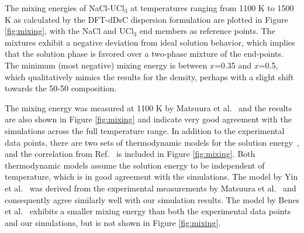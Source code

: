 \documentclass[preprint,3p,10pt,onecolumn,number,sort&compress]{elsarticle}
\begin{document}
{The mixing energies of NaCl-UCl$_3$ at temperatures ranging from 1100 K to 1500 K as calculated by the DFT-dDsC dispersion formulation are plotted in Figure \ref{fig:mixing}, with the NaCl and UCl$_3$ end members as reference points. The mixtures exhibit a negative deviation from ideal solution behavior, which implies that the solution phase is favored over a two-phase mixture of the end-points. 
 The minimum (most negative) mixing energy is between $x$=0.35 and $x$=0.5, which qualitatively mimics the results for the density, perhaps with a slight shift towards the 50-50 composition. %
 
 The mixing energy was measured at 1100 K by Matsuura et al.~\cite{Matsuura} and the results are also shown in Figure \ref{fig:mixing} and indicate very good agreement with the simulations across the full temperature range. In addition to the experimental data points, there are two sets of thermodynamic models for the solution energy~\cite{BENES2008,YIN2020}, and the correlation from Ref.~\cite{YIN2020} is included in Figure \ref{fig:mixing}. Both thermodynamic models assume the solution energy to be independent of temperature, which is in good agreement with the simulations. The model by Yin et al.~\cite{YIN2020} was derived from the experimental measurements by Matsuura et al.~\cite{Matsuura} and consequently agree similarly well with our simulation results. The model by Benes et al.~\cite{BENES2008} exhibits a smaller mixing energy than both the experimental data points and our simulations, but is not shown in Figure \ref{fig:mixing}. 


}
\end{document}
